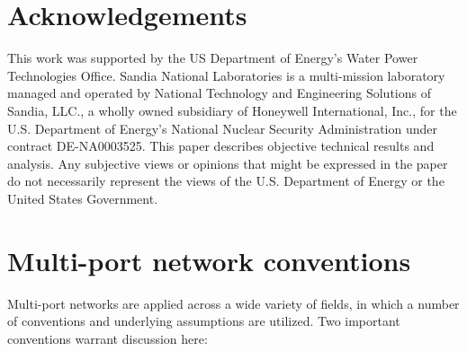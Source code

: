 \documentclass[5p,times]{elsarticle}
\begin{document}
\section{Acknowledgements}
This work was supported by the US Department of Energy's Water Power Technologies Office.
Sandia National Laboratories is a multi-mission laboratory managed and operated by National Technology and Engineering Solutions of Sandia, LLC., a wholly owned subsidiary of Honeywell International, Inc., for the U.S. Department of Energy's National Nuclear Security Administration under contract DE-NA0003525.
This paper describes objective technical results and analysis.
Any subjective views or opinions that might be expressed in the paper do not necessarily represent the views of the U.S. Department of Energy or the United States Government.

\appendix
\section{Multi-port network conventions}\label{app:conventions}
Multi-port networks are applied across a wide variety of fields, in which a number of conventions and underlying assumptions are utilized.
Two important conventions warrant discussion here:
\end{document}
